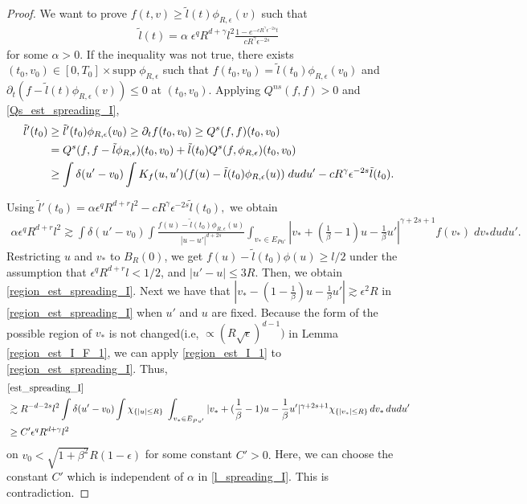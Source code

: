 \documentclass[reqno,10pt]{amsart}
\numberwithin{equation}{section}
\begin{document}
\begin{proof}
\noindent We want to prove $ f(t,v) \geq \tilde{l}(t)\phi_{R,\epsilon}(v)$ such that
\begin{align} \label{l_spreading_I}
    \tilde{l}(t)=\alpha \; \epsilon^{q}R^{d+\gamma}l^2\frac{1-e^{-c R^\gamma\epsilon^{-2s}t}}{c R^{\gamma}\epsilon^{-2s}}
\end{align} for some $\alpha >0$. If the inequality was not true, there exists $(t_0,v_0)\in [0,T_0]\times \mbox{supp}\;\phi_{R,\epsilon}$ such that $f(t_0,v_0)=\tilde{l}(t_0)\phi_{R,\epsilon}(v_0)$ and $\partial_t(f-\tilde{l}(t)\phi_{R,\epsilon}(v))\leq 0$ at $(t_0,v_0).$ 
Applying $Q^{ns}(f,f)>0$ and \eqref{Qs_est_spreading_I},
\begin{align}
    \tilde{l}'(t_0) &\geq \tilde{l}'(t_0)\phi_{R,\epsilon}(v_0) \geq \partial_t f(t_0,v_0) \geq Q^{s}(f,f)(t_0,v_0)  \notag \\
     &=Q^{s}(f,f-\tilde{l}\phi_{R,\epsilon})(t_0,v_0)+\tilde{l}(t_0)Q^{s}(f,\phi_{R,\epsilon})(t_0,v_0) \notag \\
     &\geq \int \delta(u'-v_0)\int K_f(u,u')(f(u)-\tilde{l}(t_0)\phi_{R,\epsilon}(u))\; dudu' - cR^{\gamma}\epsilon^{-2s}\tilde{l}(t_0). \label{app_Q_spreading_I}
\end{align}\vspace{2mm}

\noindent Using $\tilde{l}'(t_0)=\alpha \epsilon^q R^{d+r}l^2-cR^{\gamma}\epsilon^{-2s}\tilde{l}(t_0),$ we obtain 
\begin{align}
    \alpha \epsilon^q R^{d+r}l^2  \gtrsim \int \delta(u'-v_0)
    \int \frac{f(u)-\tilde{l}(t_0)\phi_{R,\epsilon}(u)}{|u-u'|^{d+2s}}\int_{v_*\in E_{Pu'}} |v_*+(\frac{1}{\beta}-1)u-\frac{1}{\beta}u'|^{\gamma+2s+1}f(v_*)\; dv_*dudu'.  \label{est_spreading_I} 
\end{align}
Restricting $u$ and $v_*$ to $B_R(0)$, we get $f(u)-\tilde{l}(t_0)\phi(u)\geq l/2$ under the assumption that $\epsilon^{q}R^{d+r}l < 1/2$, and  $|u'-u|\leq 3R$. Then, we obtain \eqref{region_est_spreading_I}. Next we have that $|v_*-(1-\frac{1}{\beta})u-\frac{1}{\beta}u'| \gtrsim \epsilon^2R$ in \eqref{region_est_spreading_I} when $u'$ and $u$ are fixed. Because the form of the possible region of $v_*$ is not changed(i.e, $\varpropto (R\sqrt{\epsilon})^{d-1})$ in Lemma \ref{region_est_I_F_1}, we can apply \eqref{region_est_I_1} to \eqref{region_est_spreading_I}. Thus,
\begin{align}
     &\eqref{est_spreading_I} \notag \\
     &\gtrsim  R^{-d-2s}l^2 \int \delta(u'-v_0)\int \chi_{\{|u|\leq R\}}\;\int_{v_*\in E_{Pu'}} |v_*+(\frac{1}{\beta}-1)u-\frac{1}{\beta}u'|^{\gamma+2s+1} \chi_{\{|v_*|\leq R\}} \, dv_* \, dudu'  \label{region_est_spreading_I}\\
    &\geq C'\epsilon^q R^{d+\gamma}l^2 \notag
\end{align} on $v_0<\sqrt{1+\beta^2}R(1-\epsilon)$ for some constant $C'>0.$ Here, we can choose the constant $C'$ which is independent of $\alpha$ in \eqref{l_spreading_I}. This is contradiction.
\end{proof} \vspace{3mm}
\end{document}

